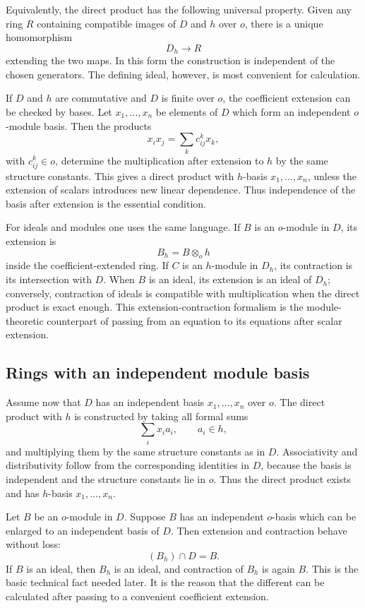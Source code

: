 \documentclass[12pt]{article}
\begin{document}
Equivalently, the direct product has the following universal property. Given any ring \(R\) containing compatible images of \(D\) and \(h\) over \(o\), there is a unique homomorphism
\[
  D_h\longrightarrow R
\]
extending the two maps. In this form the construction is independent of the chosen generators. The defining ideal, however, is most convenient for calculation.

If \(D\) and \(h\) are commutative and \(D\) is finite over \(o\), the coefficient extension can be checked by bases. Let \(x_1,\ldots,x_n\) be elements of \(D\) which form an independent \(o\)-module basis. Then the products
\[
  x_ix_j=\sum_k c_{ij}^{k}x_k,
\]
with \(c_{ij}^k\in o\), determine the multiplication after extension to \(h\) by the same structure constants. This gives a direct product with \(h\)-basis \(x_1,
\ldots,x_n\), unless the extension of scalars introduces new linear dependence. Thus independence of the basis after extension is the essential condition.

For ideals and modules one uses the same language. If \(B\) is an \(o\)-module in \(D\), its extension is
\[
  B_h=B\otimes_o h
\]
inside the coefficient-extended ring. If \(C\) is an \(h\)-module in \(D_h\), its contraction is its intersection with \(D\). When \(B\) is an ideal, its extension is an ideal of \(D_h\); conversely, contraction of ideals is compatible with multiplication when the direct product is exact enough. This extension-contraction formalism is the module-theoretic counterpart of passing from an equation to its equations after scalar extension.

\subsection{Rings with an independent module basis}

Assume now that \(D\) has an independent basis \(x_1,
\ldots,x_n\) over \(o\). The direct product with \(h\) is constructed by taking all formal sums
\[
  \sum_i x_i a_i,
  \qquad a_i\in h,
\]
and multiplying them by the same structure constants as in \(D\). Associativity and distributivity follow from the corresponding identities in \(D\), because the basis is independent and the structure constants lie in \(o\). Thus the direct product exists and has \(h\)-basis \(x_1,
\ldots,x_n\).

Let \(B\) be an \(o\)-module in \(D\). Suppose \(B\) has an independent \(o\)-basis which can be enlarged to an independent basis of \(D\). Then extension and contraction behave without loss:
\[
  (B_h)\cap D=B.
\]
If \(B\) is an ideal, then \(B_h\) is an ideal, and contraction of \(B_h\) is again \(B\). This is the basic technical fact needed later. It is the reason that the different can be calculated after passing to a convenient coefficient extension.
\end{document}
